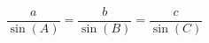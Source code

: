 \documentclass[12pt]{article}
\begin{document}
\begin{equation*}
  \frac{a}{\sin(A)} = \frac{b}{\sin(B)} = \frac{c}{\sin(C)}
\end{equation*}
\end{document}
